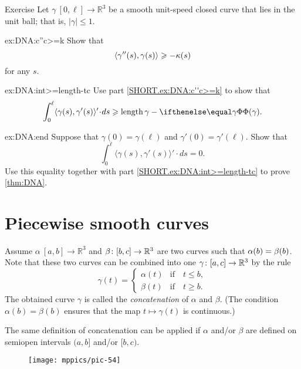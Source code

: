 \begin{thm}{Exercise}\label{ex:DNA}
Let $\gamma\:[0,\ell]\to\mathbb{R}^3$ be a smooth unit-speed closed curve that lies in the unit ball; that is, $|\gamma|\le 1$.

\begin{subthm}{ex:DNA:c''c>=k}
Show that 
\[\langle\gamma''(s),\gamma(s)\rangle\geqslant-\kappa(s)\]
for any $s$.
\end{subthm}

\begin{subthm}{ex:DNA:int>=length-tc}
Use part \ref{SHORT.ex:DNA:c''c>=k} to show that 
\[\int_0^\ell\langle\gamma(s),\gamma'(s)\rangle'\cdot ds\ge
\length\gamma-\tc\gamma.\]

\end{subthm}

\begin{subthm}{ex:DNA:end}
Suppose that $\gamma(0)=\gamma(\ell)$ and $\gamma'(0)=\gamma'(\ell)$.
Show that 
\[\int_0^\ell\langle\gamma(s),\gamma'(s)\rangle'\cdot ds=0.\]
Use this equality together with  part \ref{SHORT.ex:DNA:int>=length-tc} to prove \ref{thm:DNA}.
\end{subthm}
\end{thm}

\section{Piecewise smooth curves}

Assume $\alpha\:[a,b]\to \mathbb{R}^3$ and $\beta\:[b,c]\z\to \mathbb{R}^3$ are two curves such that $\alpha(b)\z=\beta(b)$.
Note that these two curves can be combined into one $\gamma\:[a,c]\z\to \mathbb{R}^3$ by the rule 
\[\gamma(t)=
\begin{cases}
\alpha(t)&\text{if}\quad t\le b,
\\
\beta(t)&\text{if}\quad t\ge b.
\end{cases}
\]
The obtained curve $\gamma$ is called the 
\emph{concatenation} of $\alpha$ and $\beta$. %
(The condition $\alpha(b)=\beta(b)$ ensures that the map $t\mapsto\gamma(t)$ is continuous.)

The same definition of concatenation can be applied if $\alpha$ and/or $\beta$ are defined on semiopen intervals 
$(a,b]$ and/or $[b,c)$.

\begin{wrapfigure}{o}{25 mm}
\vskip-0mm
\centering
\texttt{[image: mppics/pic-54]}
\end{wrapfigure}

